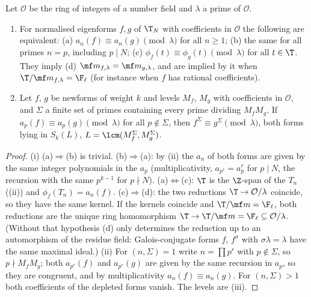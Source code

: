 \begin{proposition}[congruences]\label{prop:hecke:congruences}
Let $\mathcal O$ be the ring of integers of a number field and $\lambda$ a prime of $\mathcal O$.
\begin{enumerate}[label=(\roman*)]
\item For normalised eigenforms $f,g$ of $\T_N$ with coefficients in $\mathcal O$ the following are equivalent: (a) $a_n(f)\equiv a_n(g)\pmod\lambda$ for all $n\ge1$; (b) the same for all primes $n=p$,
including $p\mid N$; (c) $\phi_f(t)\equiv\phi_g(t)\pmod\lambda$ for all $t\in\T$. They imply (d) $\mf m_{f,\lambda}=\mf m_{g,\lambda}$, and are implied by it when
$\T/\mf m_{f,\lambda}=\F_\ell$ (for instance when $f$ has rational coefficients).
\item Let $f$, $g$ be newforms of weight $k$ and levels $M_f$, $M_g$ with coefficients in $\mathcal O$, and $\Sigma$ a finite set of primes containing every prime dividing $M_fM_g$. If
$a_p(f)\equiv a_p(g)\pmod\lambda$ for all $p\notin\Sigma$, then $f^\Sigma\equiv g^\Sigma\pmod\lambda$, both forms lying in $S_k(L)$, $L=\lcm(M_f^\Sigma,M_g^\Sigma)$.
\end{enumerate}
\end{proposition}

\begin{proof}
(i) (a)$\Rightarrow$(b) is trivial. (b)$\Rightarrow$(a): by (ii) the $a_n$ of both forms are given by the same integer polynomials in the $a_p$ (multiplicativity,
$a_{p^r}=a_p^r$ for $p\mid N$, the recursion with the same $p^{k-1}$ for $p\nmid N$). (a)$\Leftrightarrow$(c): $\T$ is the $\Z$-span of the $T_n$ ((ii)) and $\phi_f(T_n)=a_n(f)$. (c)$\Rightarrow$(d): the two reductions $\T\to\mathcal O/\lambda$ coincide, so they have the same kernel. If the kernels coincide and $\T/\mf m=\F_\ell$, both reductions are the unique
ring homomorphism $\T\to\T/\mf m=\F_\ell\subseteq\mathcal O/\lambda$. (Without that hypothesis (d) only determines the reduction up to an automorphism of the residue field: Galois-conjugate
forms $f$, $f^\sigma$ with $\sigma\lambda=\lambda$ have the same maximal ideal.) (ii) For $(n,\Sigma)=1$ write $n=\prod p^r$ with $p\notin\Sigma$, so $p\nmid M_fM_g$; both $a_{p^r}(f)$ and $a_{p^r}(g)$ are given by the same recursion in $a_p$,
so they are congruent, and by multiplicativity $a_n(f)\equiv a_n(g)$. For $(n,\Sigma)>1$ both coefficients of the depleted forms vanish. The levels are (iii).
\end{proof}

